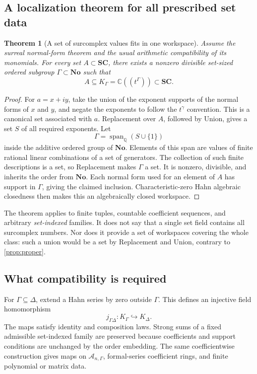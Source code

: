 \documentclass[11pt,letterpaper]{article}
\newtheorem{theorem}{Theorem}[section]
\theoremstyle{definition}
\theoremstyle{remark}
\newcommand{\No}{\mathbf{No}}
\newcommand{\SC}{\mathbf{SC}}
\newcommand{\C}{\mathbb C}
\newcommand{\Q}{\mathbb Q}
\newcommand{\A}{\mathscr A}
\numberwithin{equation}{section}
\begin{document}
\subsection{A localization theorem for all prescribed set data}
\begin{theorem}[A set of surcomplex values fits in one workspace]\label{thm:workspace}
Assume the surreal normal-form theorem and the usual arithmetic compatibility of its monomials. For every set \(A\subset\SC\), there exists a nonzero divisible set-sized ordered subgroup \(\Gamma\subset\No\) such that
\[
 A\subseteq K_\Gamma=\C((t^\Gamma))\subset\SC.
\]
\end{theorem}
\begin{proof}
For \(a=x+iy\), take the union of the exponent supports of the normal forms of \(x\) and \(y\), and negate the exponents to follow the \(t^\gamma\) convention. This is a canonical set associated with \(a\). Replacement over \(A\), followed by Union, gives a set \(S\) of all required exponents. Let
\[
 \Gamma=\operatorname{span}_{\Q}(S\cup\{1\})
\]
inside the additive ordered group of \(\No\). Elements of this span are values of finite rational linear combinations of a set of generators. The collection of such finite descriptions is a set, so Replacement makes \(\Gamma\) a set. It is nonzero, divisible, and inherits the order from \(\No\). Each normal form used for an element of \(A\) has support in \(\Gamma\), giving the claimed inclusion. Characteristic-zero Hahn algebraic closedness then makes this an algebraically closed workspace.
\end{proof}

The theorem applies to finite tuples, countable coefficient sequences, and arbitrary \emph{set-indexed} families. It does not say that a single set field contains all surcomplex numbers. Nor does it provide a set of workspaces covering the whole class: such a union would be a set by Replacement and Union, contrary to \cref{prop:proper}.

\subsection{What compatibility is required}
For \(\Gamma\subseteq\Delta\), extend a Hahn series by zero outside \(\Gamma\). This defines an injective field homomorphism
\[
 j_{\Gamma\Delta}:K_\Gamma\hookrightarrow K_\Delta.
\]
The maps satisfy identity and composition laws. Strong sums of a fixed admissible set-indexed family are preserved because coefficients and support conditions are unchanged by the order embedding. The same coefficientwise construction gives maps on \(\A_{n,\Gamma}\), formal-series coefficient rings, and finite polynomial or matrix data.
\end{document}

